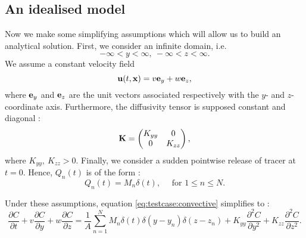 \subsection*{An idealised model}
Now we make some simplifying assumptions which will allow us to build an analytical solution. First, we consider an infinite domain, i.e.
\begin{equation} \label{eq:testcase:domain}
	-\infty < y < \infty, \ -\infty < z < \infty.
\end{equation}
We assume a constant velocity field
\begin{equation} \label{eq:testcase:velocity}
	\mathbf{u}(t,\mathbf{x}) = v \mathbf e_y + w \mathbf e_z,
\end{equation}
where $\mathbf e_y$ and $\mathbf e_z$ are the unit vectors associated respectively with the $y$- and $z$-coordinate axis. Furthermore, the diffusivity tensor is supposed constant and diagonal :
\begin{equation} \label{eq:testcase:diffusivity}
	\mathbf{K} = \begin{pmatrix}
			K_{yy} & 0 \\
			0 & K_{zz}
			\end{pmatrix},	
\end{equation}
where $K_{yy},\ K_{zz} > 0$. Finally, we consider a sudden pointwise release of tracer at $t=0$. Hence, $Q_n(t)$ is of the form :
\begin{equation}
	Q_n(t) = M_n\delta(t), \quad \mbox{ for } 1 \le n \le N.
\end{equation} 

Under these assumptions, equation \eqref{eq:testcase:convective} simplifies to :
\begin{equation} \label{eq:testcase}
	\frac{\partial C}{\partial t} + v \frac{\partial C}{\partial y} + w \frac{\partial C}{\partial z} = \frac{1}{A}\sum_{n=1}^N M_n \delta(t) \delta(y - y_n)\delta(z-z_n) + K_{yy} \frac{\partial^2 C}{\partial y^2} + K_{zz} \frac{\partial^2 C}{\partial z^2}.
\end{equation}

